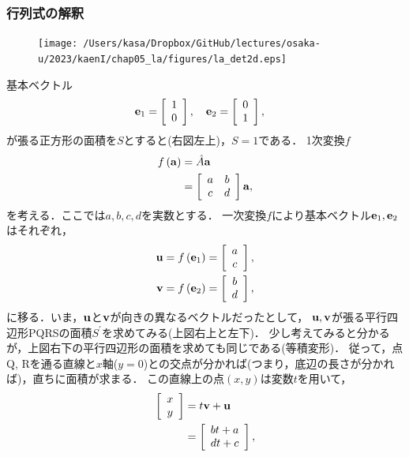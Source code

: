 \subsubsection{行列式の解釈}
%
%
\begin{figure}
  \centering
  \vspace*{-\intextsep}
  \texttt{[image: /Users/kasa/Dropbox/GitHub/lectures/osaka-u/2023/kaenI/chap05\_la/figures/la\_det2d.eps]} 
\end{figure}
%
基本ベクトル
%
\begin{align}
{\bf e}_{1} & =\left[\begin{array}{c}
1\\
0
\end{array}\right],\quad{\bf e}_{2}=\left[\begin{array}{c}
0\\
1
\end{array}\right], 
\end{align}
が張る正方形の面積を$S$とすると(右図左上)，$S=1$である．
%
1次変換$f$
\begin{align}
f\left({\bf a}\right) & =\hat{A}{\bf a}\notag\\
 & =\left[\begin{array}{cc}
a & b\\
c & d
\end{array}\right]{\bf a}, 
\end{align}
を考える．ここでは$a,b,c,d$を実数とする．
一次変換$f$により基本ベクトル${\bf e}_{1},{\bf e}_{2}$はそれぞれ，
\begin{align}
{\bf u} & =f\left({\bf e}_{1}\right)
=
\left[\begin{array}{c}
a\\
c
\end{array}\right],\\
{\bf v} & =f\left({\bf e}_{2}\right)
=
\left[\begin{array}{c}
b\\
d
\end{array}\right],  
\end{align}
に移る．いま，${\bf u}$と${\bf v}$が向きの異なるベクトルだったとして，
${\bf u}, {\bf v}$が張る平行四辺形PQRSの面積$S^{\prime}$を求めてみる(上図右上と左下)．
%
少し考えてみると分かるが，上図右下の平行四辺形の面積を求めても同じである(等積変形)．
従って，点Q, Rを通る直線と$x$軸($y=0$)との交点が分かれば(つまり，底辺の長さが分かれば)，直ちに面積が求まる．
この直線上の点$(x,y)$は変数$t$を用いて，
%
\begin{align}
\left[\begin{array}{c}
x\\
y
\end{array}\right] & =t{\bf v}+{\bf u}\notag\\
 & =\left[\begin{array}{c}
bt+a\\
dt+c
\end{array}\right], 
\end{align}
